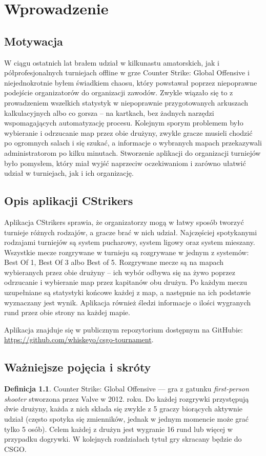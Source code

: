 \documentclass[shortabstract]{iithesis}
\author         {Tomasz Woszczyński}
\theoremstyle{definition} \newtheorem{definition}{Definicja}[]
\theoremstyle{remark} \newtheorem{remark}[definition]{Observation}
\theoremstyle{plain} \newtheorem{theorem}[definition]{Theorem}
\theoremstyle{plain} \newtheorem{lemma}[definition]{Lemma}
\begin{document}

\chapter{Wprowadzenie}
\section{Motywacja}
W ciągu ostatnich lat brałem udział w kilkunastu amatorskich, jak i półprofesjonalnych turniejach offline w grze Counter Strike: Global Offensive i niejednokrotnie byłem świadkiem chaosu, który powstawał poprzez niepoprawne podejście organizatorów do organizacji zawodów. Zwykle wiązało się to z prowadzeniem wszelkich statystyk w niepoprawnie przygotowanych arkuszach kalkulacyjnych albo co gorsza -- na kartkach, bez żadnych narzędzi wspomagających automatyzację procesu. Kolejnym sporym problemem było wybieranie i odrzucanie map przez obie drużyny, zwykle gracze musieli chodzić po ogromnych salach i się szukać, a informacje o wybranych mapach przekazywali administratorom po kilku minutach. Stworzenie aplikacji do organizacji turniejów było pomysłem, który miał wyjść naprzeciw oczekiwaniom i zarówno ułatwić udział w turniejach, jak i ich organizację.

\section{Opis aplikacji CStrikers}
Aplikacja CStrikers sprawia, że organizatorzy mogą w łatwy sposób tworzyć turnieje różnych rodzajów, a gracze brać w nich udział. Najczęściej spotykanymi rodzajami turniejów są system pucharowy, system ligowy oraz system mieszany. Wszystkie mecze rozgrywane w turnieju są rozgrywane w jednym z systemów: Best Of 1, Best Of 3 albo Best of 5. Rozgrywane mecze są na mapach wybieranych przez obie drużyny -- ich wybór odbywa się na żywo poprzez odrzucanie i wybieranie map przez kapitanów obu drużyn. Po każdym meczu uzupełniane są statystyki końcowe każdej z map, a następnie na ich podstawie wyznaczany jest wynik. Aplikacja również śledzi informacje o ilości wygranych rund przez obie strony na każdej mapie.

Aplikacja znajduje się w publicznym repozytorium dostępnym na GitHubie: \url{https://github.com/whiskeyo/csgo-tournament}.


\section{Ważniejsze pojęcia i skróty}
\begin{definition}
    Counter Strike: Global Offensive --- gra z gatunku \textit{first-person shooter} stworzona przez Valve w 2012. roku. Do każdej rozgrywki przystępują dwie drużyny, każda z nich składa się zwykle z 5 graczy biorących aktywnie udział (często spotyka się zmienników, jednak w jednym momencie może grać tylko 5 osób). Celem każdej z drużyn jest wygranie 16 rund lub więcej w przypadku dogrywki. W kolejnych rozdziałach tytuł gry skracany będzie do CSGO.
\end{definition}
\end{document}

